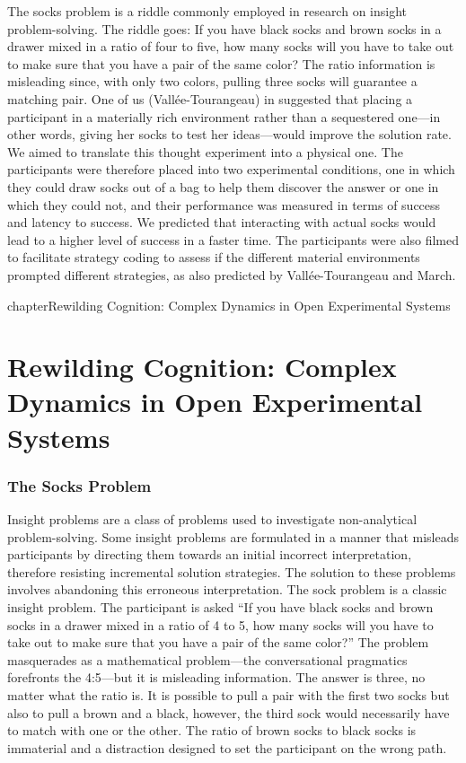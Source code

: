 The socks problem is a riddle commonly employed in research on insight problem-solving. The riddle goes: If you have black socks and brown socks in a drawer mixed in a ratio of four to five, how many socks will you have to take out to make sure that you have a pair of the same color? The ratio information is misleading since, with only two colors, pulling three socks will guarantee a matching pair. One of us (Vallée-Tourangeau) in \textcite{Vallée-Tourangeau2020} suggested that placing a participant in a materially rich environment rather than a sequestered one---in other words, giving her socks to test her ideas---would improve the solution rate. We aimed to translate this thought experiment into a physical one. The participants were therefore placed into two experimental conditions, one in which they could draw socks out of a bag to help them discover the answer or one in which they could not, and their performance was measured in terms of success and latency to success. We predicted that interacting with actual socks would lead to a higher level of success in a faster time. The participants were also filmed to facilitate strategy coding to assess if the different material environments prompted different strategies, as also predicted by Vallée-Tourangeau and March.


chapter{Rewilding Cognition: Complex Dynamics in Open Experimental Systems}
\chapter{Rewilding Cognition: Complex Dynamics in Open Experimental Systems}


\subsection{The Socks Problem}

Insight problems are a class of problems used to investigate non-analytical problem-solving. Some insight problems are formulated in a manner that misleads participants by directing them towards an initial incorrect interpretation, therefore resisting incremental solution strategies. The solution to these problems involves abandoning this erroneous interpretation. The sock problem is a classic insight problem.
The participant is asked ``If you have black socks and brown socks in a drawer mixed in a ratio of 4 to 5, how many socks will you have to take out to make sure that you have a pair of the same color?'' The problem masquerades as a mathematical problem---the conversational pragmatics forefronts the 4:5---but it is misleading information. The answer is three, no matter what the ratio is. It is possible to pull a pair with the first two socks but also to pull a brown and a black, however, the third sock would necessarily have to match with one or the other. The ratio of brown socks to black socks is immaterial and a distraction designed to set the participant on the wrong path.

